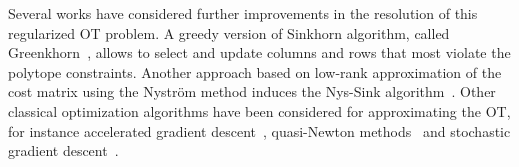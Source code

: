 Several works have considered further improvements in the resolution of this regularized OT problem.
A greedy version of Sinkhorn algorithm, called Greenkhorn~\cite{altschulernips17}, allows to select and update columns and rows that most violate the polytope constraints.                   
Another approach based on low-rank approximation of the cost matrix using the Nystr\"om method induces the Nys-Sink algorithm~\citep{altschuler2018Nystrom}. 
Other classical optimization algorithms have been considered for approximating the OT, for instance accelerated gradient descent~\citep{xie2018proxpointOT,dvurechensky18aICML,lin2019}, quasi-Newton methods~\citep{blondel2018ICML,cuturi2016SIAM} and stochastic gradient descent~\citep{genevay2016stochOT,khalilabid2018}. 

